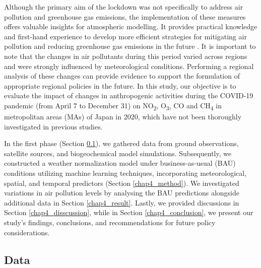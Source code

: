 Although the primary aim of the lockdown was not specifically to address air pollution and greenhouse gas emissions, the implementation of these measures offers valuable insights for atmospheric modelling. It provides practical knowledge and first-hand experience to develop more efficient strategies for mitigating air pollution and reducing greenhouse gas emissions in the future \citep{grange2021covid}. It is important to note that the changes in air pollutants during this period varied across regions and were strongly influenced by meteorological conditions. Performing a regional analysis of these changes can provide evidence to support the formulation of appropriate regional policies in the future. In this study, our objective is to evaluate the impact of changes in anthropogenic activities during the COVID-19 pandemic (from April 7 to December 31) on NO\textsubscript{2}, O\textsubscript{3}, CO and CH\textsubscript{4} in metropolitan areas (MAs) of Japan in 2020, which have not been thoroughly investigated in previous studies. \par

In the first phase (Section \ref{chap4_data}), we gathered data from ground observations, satellite sources, and biogeochemical model simulations. Subsequently, we constructed a weather normalization model under business-as-usual (BAU) conditions utilizing machine learning techniques, incorporating meteorological, spatial, and temporal predictors (Section \ref{chap4_method}). We investigated variations in air pollution levels by analysing the BAU predictions alongside additional data in Section \ref{chap4_result}. Lastly, we provided discussions in Section \ref{chap4_disscussion}, while in Section \ref{chap4_conclusion}, we present our study's findings, conclusions, and recommendations for future policy considerations.\par

\subsection{Data} \label{chap4_data}
